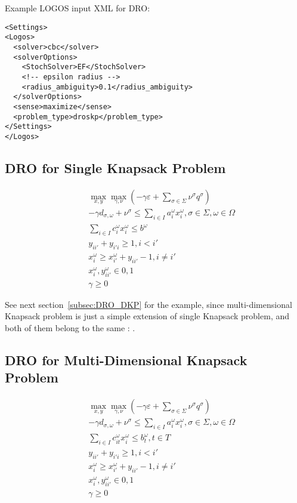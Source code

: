 Example LOGOS input XML for DRO:
\begin{lstlisting}[style=XML]
<Settings>
<Logos>
  <solver>cbc</solver>
  <solverOptions>
    <StochSolver>EF</StochSolver>
    <!-- epsilon radius -->
    <radius_ambiguity>0.1</radius_ambiguity>
  </solverOptions>
  <sense>maximize</sense>
  <problem_type>droskp</problem_type>
</Settings>
</Logos>
\end{lstlisting}

\subsection{DRO for Single Knapsack Problem}
\label{DRO_SKP}

\vst {}
\begin{subequations}\label{DROSimpleKP}
\begin{eqnarray}
& & \max_{x, y} \max_{\gamma, \nu} (-\gamma \varepsilon + \sum_{\sigma \in \Sigma} \nu^\sigma q^\sigma)  \\
& &  -\gamma d_{\sigma, \omega} + \nu^\sigma \le \sum _{i \in I} a_{i}^{ \omega }x_{i}^{ \omega }, \sigma \in \Sigma, \omega \in \Omega \\
& & \sum_{i \in I} c_{i}^\omega x_{i}^\omega \leq b^\omega \\
& & y_{ii'} + y_{i'i} \geq 1, i<i'  \\
& & x_{i}^\omega \geq x_{i'}^\omega + y_{ii'}-1, i\neq i' \\
& & x_{i}^\omega, y_{ii'}^\omega \in {0, 1} \\
& & \gamma \ge 0
\end{eqnarray}
\end{subequations}

See next section~\ref{subsec:DRO_DKP} for the example, since multi-dimensional Knapsack problem
is just a simple extension of single Knapsack problem, and both of them belong to the same
: .


\subsection{DRO for Multi-Dimensional Knapsack Problem}
\label{DRO_DKP}

\vst {}
\begin{subequations}\label{DROMultiDKP}
\begin{eqnarray}
& & \max_{x, y} \max_{\gamma, \nu} (-\gamma \varepsilon + \sum_{\sigma \in \Sigma} \nu^\sigma q^\sigma)  \\
& &  -\gamma d_{\sigma, \omega} + \nu^\sigma \le \sum _{i \in I} a_{i}^{ \omega }x_{i}^{ \omega }, \sigma \in \Sigma, \omega \in \Omega \\
& & \sum_{i \in I} c_{it}^\omega x_{i}^\omega \leq b_{t}^\omega, t\in T \\
& & y_{ii'} + y_{i'i} \geq 1, i<i'  \\
& & x_{i}^\omega \geq x_{i'}^\omega + y_{ii'}-1, i\neq i' \\
& & x_{i}^\omega, y_{ii'}^\omega \in {0, 1} \\
& & \gamma \ge 0
\end{eqnarray}
\end{subequations}

